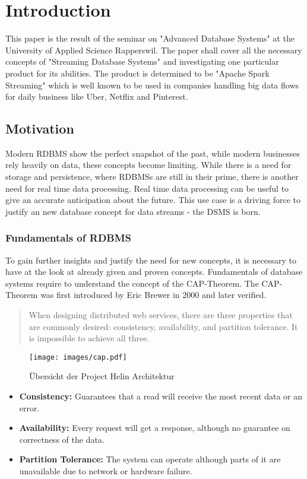 \chapter{Introduction}

This paper is the result of the seminar on "Advanced Database Systems" at the University of Applied Science Rapperswil. The paper shall cover all the necessary concepts of "Streaming Database Systems" and investigating one particular product for its abilities. The product is determined to be "Apache Spark Streaming" which is well known to be used in companies handling big data flows for daily business like Uber\cite{uber}, Netflix and Pinterest.

\section{Motivation}
Modern \Gls{RDBMS} show the perfect snapshot of the past, while modern businesses rely heavily on data, these concepts become limiting. While there is a need for storage and persistence, where \Gls{RDBMS}s are still in their prime, there is another need for real time data processing. Real time data processing can be useful to give an accurate anticipation about the future. This use case is a driving force to justify an new database concept for data streams - the \Gls{DSMS} is born. 
\\
\subsection{Fundamentals of \Gls{RDBMS}}
To gain further insights and justify the need for new concepts, it is necessary to have at the look at already given and proven concepts. Fundamentals of database systems require to understand the concept of the CAP-Theorem. The CAP-Theorem was first introduced by Eric Brewer in 2000 and later verified.
\\
\blockquote{When designing distributed web services, there are three properties that are commonly desired: consistency, availability, and partition tolerance. It is impossible to achieve all three.} \cite[S. 1]{Gilbert:2002:BCF:564585.564601}

\begin{figure}[H]
	\centering
	\texttt{[image: images/cap.pdf]}
	\caption{Übersicht der Project Helin Architektur }
	\label{fig:architecture-overview}
\end{figure}

\begin{itemize}
	\item{\textbf{Consistency:} Guarantees that a read will receive the most recent data or an error.}
	\item{\textbf{Availability:} Every request will get a response, although no guarantee on correctness of the data. }
	\item{\textbf{Partition Tolerance:} The system can operate although parts of it are unavailable due to network or hardware failure.}
	
\end{itemize}


